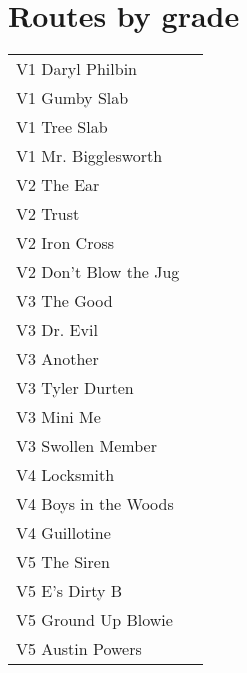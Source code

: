 \section{Routes by grade}
\begin{center}
\begin{supertabular}{lr}
V1 Daryl Philbin     & \pageref{rt:Daryl Philbin} \\
V1 Gumby Slab     & \pageref{rt:Gumby Slab} \\
V1 Tree Slab    & \pageref{rt:Tree Slab} \\
V1 Mr. Bigglesworth  & \pageref{vr:Mr. Bigglesworth} \\
V2 The Ear     & \pageref{rt:The Ear} \\
V2 Trust     & \pageref{rt:Trust} \\
V2 Iron Cross  & \pageref{vr:Iron Cross} \\
V2 Don't Blow the Jug & \pageref{rt:Don't Blow the Jug} \\
V3 The Good    & \pageref{rt:The Good} \\
V3 Dr. Evil   & \pageref{rt:Dr. Evil} \\
V3 Another   & \pageref{rt:Another} \\
V3 Tyler Durten  & \pageref{rt:Tyler Durten} \\
V3 Mini Me & \pageref{rt:Mini Me} \\
V3 Swollen Member & \pageref{rt:Swollen Member} \\
V4 Locksmith      & \pageref{rt:Locksmith} \\
V4 Boys in the Woods    & \pageref{rt:Boys in the Woods} \\
V4 Guillotine    & \pageref{rt:Guillotine} \\
V5 The Siren      & \pageref{rt:The Siren} \\
V5 E's Dirty B    & \pageref{rt:E's Dirty B} \\
V5 Ground Up Blowie    & \pageref{rt:Ground Up Blowie} \\
V5 Austin Powers   & \pageref{rt:Austin Powers} \\

\end{supertabular}
\end{center}
